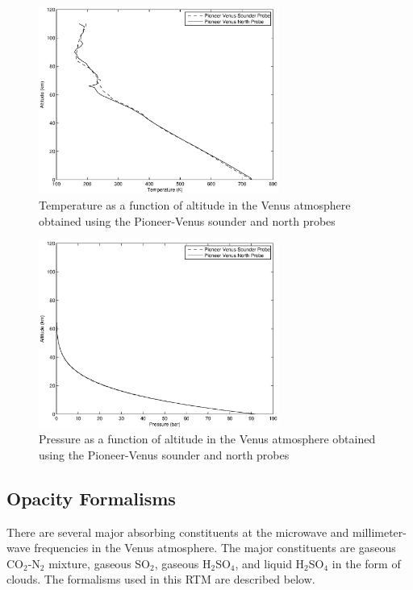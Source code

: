 \begin{figure}[p]
    \centering
	\includegraphics[width=0.7\textwidth]{./rtm/plots/alt-temp.eps}
	\caption{Temperature as a function of altitude in the Venus atmosphere obtained using the Pioneer-Venus sounder and north probes }
		\label{fig:temp}
\end{figure}
\begin{figure}[p]
    \centering
	\includegraphics[width=0.7\textwidth]{./rtm/plots/alt-pres.eps}
	\caption{Pressure as a function of altitude in the Venus atmosphere obtained using the Pioneer-Venus sounder and north probes }
		\label{fig:pres}
\end{figure}

\subsection{Opacity Formalisms}

There are several major absorbing constituents at the microwave and millimeter-wave frequencies in the Venus atmosphere. The major constituents are gaseous CO$_2$-N$_2$ mixture, gaseous SO$_2$, gaseous H$_2$SO$_4$, and liquid H$_2$SO$_4$ in the form of clouds. The formalisms used in this RTM are described below.
